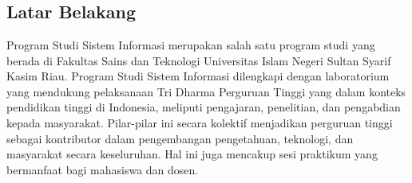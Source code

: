 %
%
%
%

\chapter{\babSatu}

\section{Latar Belakang}
Program Studi Sistem Informasi merupakan salah satu program studi yang berada di Fakultas Sains dan Teknologi Universitas Islam Negeri Sultan Syarif Kasim Riau. Program Studi Sistem Informasi dilengkapi dengan laboratorium yang mendukung pelaksanaan Tri Dharma Perguruan Tinggi yang dalam konteks pendidikan tinggi di Indonesia, meliputi pengajaran, penelitian, dan pengabdian kepada masyarakat. Pilar-pilar ini secara kolektif menjadikan perguruan tinggi sebagai kontributor dalam pengembangan pengetahuan, teknologi, dan masyarakat secara keseluruhan. Hal ini juga mencakup sesi praktikum yang bermanfaat bagi mahasiswa dan dosen.

